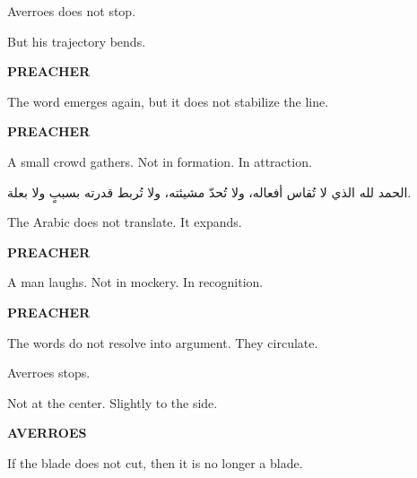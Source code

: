 \medskip

Averroes does not stop.

But his trajectory bends.

\medskip

\textbf{PREACHER}


\medskip

The word emerges again, but it does not stabilize the line.

\medskip

\textbf{PREACHER}


\medskip

A small crowd gathers. Not in formation. In attraction.

\medskip

\begin{AR}
الحمد لله الذي لا تُقاس أفعاله، ولا تُحدّ مشيئته، ولا تُربط قدرته بسببٍ ولا بعلة.
\end{AR}

\medskip

The Arabic does not translate. It expands.

\medskip

\textbf{PREACHER}


\medskip

A man laughs. Not in mockery. In recognition.

\medskip

\textbf{PREACHER}


\medskip

The words do not resolve into argument. They circulate.

Averroes stops.

Not at the center. Slightly to the side.

\medskip

\textbf{AVERROES}

If the blade does not cut, then it is no longer a blade.

